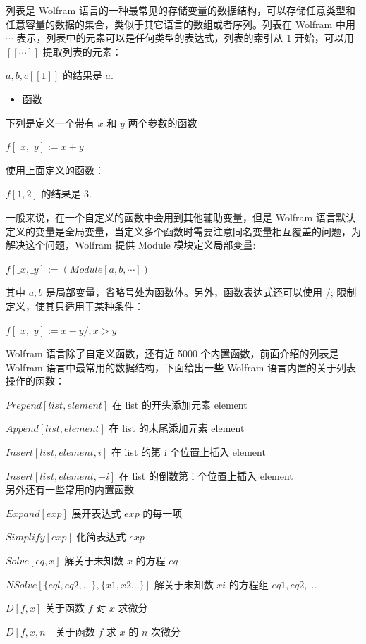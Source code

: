 列表是 Wolfram 语言的一种最常见的存储变量的数据结构，可以存储任意类型和任意容量的数据的集合，类似于其它语言的数组或者序列。列表在 Wolfram 中用 ${\cdots}$ 表示，列表中的元素可以是任何类型的表达式，列表的索引从 1 开始，可以用 $[[\cdots]]$ 提取列表的元素：

${a,b,c}[[1]]$ 的结果是 $a$.
\begin{itemize}
\item 函数
\end{itemize}

下列是定义一个带有 $x$ 和 $y$ 两个参数的函数

$f[\_x,\_y]:= x+y$

使用上面定义的函数：

$f[1,2]$ 的结果是 3.

一般来说，在一个自定义的函数中会用到其他辅助变量，但是 Wolfram 语言默认定义的变量是全局变量，当定义多个函数时需要注意同名变量相互覆盖的问题，为解决这个问题，Wolfram 提供 Module 模块定义局部变量:

$f[\_x,\_y]:=(Module[{a,b},\cdots])$

其中 $a,b$ 是局部变量，省略号处为函数体。另外，函数表达式还可以使用 /; 限制定义，使其只适用于某种条件：

$f[\_x,\_y]:= x-y/;x>y$

Wolfram 语言除了自定义函数，还有近 5000 个内置函数，前面介绍的列表是 Wolfram 语言中最常用的数据结构，下面给出一些 Wolfram 语言内置的关于列表操作的函数：

$Prepend[list,element]$	\quad 在 list 的开头添加元素 element

$Append[list,element]$	\quad 在 list 的末尾添加元素 element

$Insert[list,element,i]$ \quad	在 list 的第 i 个位置上插入 element

$Insert[list,element,-i]$ \quad	在 list 的倒数第 i 个位置上插入 element\\
另外还有一些常用的内置函数

$Expand[exp]$ \quad                       展开表达式 $exp$ 的每一项

$Simplify[exp]$  \quad                     化简表达式 $exp$

$Solve[eq,x]$  \quad           解关于未知数 $x$ 的方程 $eq$

$NSolve[\{eql,eq2,...\},\{x1, x2...\}]$   \quad    解关于未知数 $xi$ 的方程组 $eq1,eq2,...$

$D[f,x]$     \quad                    关于函数 $f$ 对 $x$ 求微分

$D[f,{x,n}]$     \quad                    关于函数 $f$ 求 $x$ 的 $n$ 次微分

